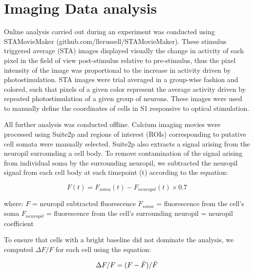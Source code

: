 \section{Imaging Data analysis}

Online analysis carried out during an experiment was conducted using STAMovieMaker (github.com/llerussell/STAMovieMaker). These stimulus triggered average (STA) images displayed visually the change in activity of each pixel in the field of view post-stimulus relative to pre-stimulus, thus the pixel intensity of the image was proportional to the increase in activity driven by photostimulation. STA images were trial averaged in a group-wise fashion and colored, such that pixels of a given color represent the average activity driven by repeated photostimulation of a given group of neurons. These images were used to manually define the coordinates of cells in S1 responsive to optical stimulation.

All further analysis was conducted offline. Calcium imaging movies were processed using Suite2p \cite{pachitariu_suite2p_2016} and regions of interest (ROIs) corresponding to putative cell somata were manually selected. Suite2p also extracts a signal arising from the neuropil surrounding a cell body. To remove contamination of the signal arising from individual soma by the surrounding neuropil, we subtracted the neuropil signal from each cell body at each timepoint (t) according to the equation:

\begin{equation} \label{eq:neuropil_sub}
F(t) = F_{soma}(t) - F_{neuropil}(t) \times 0.7
\end{equation}

where: \newline
$F$ = neuropil subtracted fluorescence \newline
$F_{soma}$ = fluorescence from the cell's soma \newline
$F_{neuropil}$ = fluorescence from the cell's surrounding neuropil  = neuropil coefficient \cite{chen_ultrasensitive_2013} \newline

To ensure that cells with a bright baseline did not dominate the analysis, we computed $\Delta F/F$ for each cell using the equation:

\begin{equation} \label{eq:dff}
\Delta F/F = (F  - \Bar{F}) / \Bar{F}
\end{equation}

